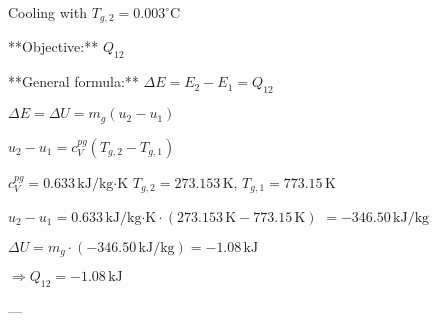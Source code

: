 Cooling with \( T_{g,2} = 0.003^\circ \text{C} \)  

**Objective:** \( Q_{12} \)  

**General formula:**  
\( \Delta E = E_2 - E_1 = Q_{12} \)  

\( \Delta E = \Delta U = m_g (u_2 - u_1) \)  

\( u_2 - u_1 = c_V^{pg} (T_{g,2} - T_{g,1}) \)  

\( c_V^{pg} = 0.633 \, \text{kJ/kg·K} \)  
\( T_{g,2} = 273.153 \, \text{K}, \, T_{g,1} = 773.15 \, \text{K} \)  

\( u_2 - u_1 = 0.633 \, \text{kJ/kg·K} \cdot (273.153 \, \text{K} - 773.15 \, \text{K}) \)  
\( = -346.50 \, \text{kJ/kg} \)  

\( \Delta U = m_g \cdot (-346.50 \, \text{kJ/kg}) = -1.08 \, \text{kJ} \)  

\( \Rightarrow Q_{12} = -1.08 \, \text{kJ} \)  

---